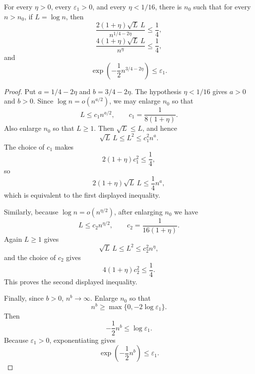 \begin{helper}
For every \(\eta>0\), every \(\varepsilon_1>0\), and every
\(\eta<1/16\), there is \(n_0\) such that for every \(n>n_0\), if
\(L=\log n\), then
\[
\frac{2(1+\eta)\sqrt L\,L}{n^{1/4-2\eta}}\le \frac14,
\]
\[
\frac{4(1+\eta)\sqrt L\,L}{n^\eta}\le \frac14,
\]
and
\[
\exp\!\left(-\frac12 n^{3/4-2\eta}\right)\le\varepsilon_1.
\]
\end{helper}
\begin{proof}
Put \(a=1/4-2\eta\) and \(b=3/4-2\eta\).  The hypothesis
\(\eta<1/16\) gives \(a>0\) and \(b>0\).  Since \(\log n=o(n^{a/2})\),
we may enlarge \(n_0\) so that
\[
L\le c_1 n^{a/2},\qquad c_1=\frac1{8(1+\eta)}.
\]
Also enlarge \(n_0\) so that \(L\ge1\).  Then \(\sqrt L\le L\), and hence
\[
\sqrt L\,L\le L^2\le c_1^2 n^a.
\]
The choice of \(c_1\) makes
\[
2(1+\eta)c_1^2\le \frac14,
\]
so
\[
2(1+\eta)\sqrt L\,L\le \frac14 n^a,
\]
which is equivalent to the first displayed inequality.

Similarly, because \(\log n=o(n^{\eta/2})\), after enlarging \(n_0\) we have
\[
L\le c_2 n^{\eta/2},\qquad c_2=\frac1{16(1+\eta)}.
\]
Again \(L\ge1\) gives
\[
\sqrt L\,L\le L^2\le c_2^2 n^\eta,
\]
and the choice of \(c_2\) gives
\[
4(1+\eta)c_2^2\le\frac14.
\]
This proves the second displayed inequality.

Finally, since \(b>0\), \(n^b\to\infty\).  Enlarge \(n_0\) so that
\[
n^b\ge \max\{0,-2\log\varepsilon_1\}.
\]
Then
\[
-\frac12n^b\le \log\varepsilon_1.
\]
Because \(\varepsilon_1>0\), exponentiating gives
\[
\exp\!\left(-\frac12 n^b\right)\le\varepsilon_1.
\]
\end{proof}
